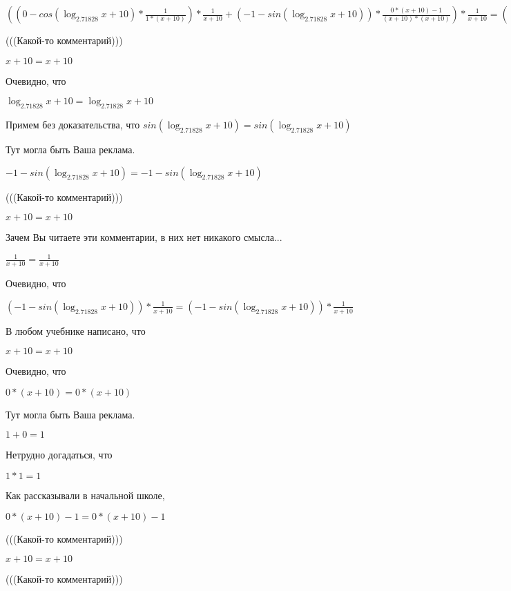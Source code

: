 \documentclass[12pt,a4paper,fleqn]{article}
\theoremstyle{definition}
\begin{document}
$(( 0  - cos(\log_{ 2.71828 }{ x  +  10 }) * \frac{ 1 }{ 1  * ( x  +  10 )}
) * \frac{ 1 }{ x  +  10 }
 + ( -1  - sin(\log_{ 2.71828 }{ x  +  10 })) * \frac{ 0  * ( x  +  10 ) -  1 }{( x  +  10 ) * ( x  +  10 )}
) * \frac{ 1 }{ x  +  10 }
 = (( 0  - cos(\log_{ 2.71828 }{ x  +  10 }) * \frac{ 1 }{ 1  * ( x  +  10 )}
) * \frac{ 1 }{ x  +  10 }
 + ( -1  - sin(\log_{ 2.71828 }{ x  +  10 })) * \frac{ 0  * ( x  +  10 ) -  1 }{( x  +  10 ) * ( x  +  10 )}
) * \frac{ 1 }{ x  +  10 }
$

(((Какой-то комментарий)))

$ x  +  10  =  x  +  10 $

Очевидно, что

$\log_{ 2.71828 }{ x  +  10 } = \log_{ 2.71828 }{ x  +  10 }$

Примем без доказательства, что
$sin(\log_{ 2.71828 }{ x  +  10 }) = sin(\log_{ 2.71828 }{ x  +  10 })$

Тут могла быть Ваша реклама.

$ -1  - sin(\log_{ 2.71828 }{ x  +  10 }) =  -1  - sin(\log_{ 2.71828 }{ x  +  10 })$

(((Какой-то комментарий)))

$ x  +  10  =  x  +  10 $

Зачем Вы читаете эти комментарии, в них нет никакого смысла...

$\frac{ 1 }{ x  +  10 }
 = \frac{ 1 }{ x  +  10 }
$

Очевидно, что

$( -1  - sin(\log_{ 2.71828 }{ x  +  10 })) * \frac{ 1 }{ x  +  10 }
 = ( -1  - sin(\log_{ 2.71828 }{ x  +  10 })) * \frac{ 1 }{ x  +  10 }
$

В любом учебнике написано, что

$ x  +  10  =  x  +  10 $

Очевидно, что

$ 0  * ( x  +  10 ) =  0  * ( x  +  10 )$

Тут могла быть Ваша реклама.

$ 1  +  0  =  1 $

Нетрудно догадаться, что

$ 1  *  1  =  1 $

Как рассказывали в начальной школе,

$ 0  * ( x  +  10 ) -  1  =  0  * ( x  +  10 ) -  1 $

(((Какой-то комментарий)))

$ x  +  10  =  x  +  10 $

(((Какой-то комментарий)))
\end{document}

